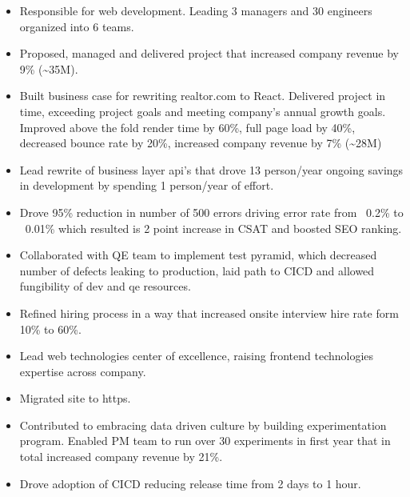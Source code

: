 \documentclass[11pt,a4paper,roman]{moderncv}       %
\begin{document}
\begin{itemize}
    \item Responsible for web development. Leading 3 managers and 30 engineers organized into 6 teams. 
    \item Proposed, managed and delivered project that increased company revenue by 9\% (\textasciitilde35M).
    \item Built business case for rewriting realtor.com to React. Delivered project in time, exceeding project goals and meeting company's annual growth goals. Improved above the fold render time by 60\%, full page load by 40\%, decreased bounce rate by 20\%, increased company revenue by 7\% (\textasciitilde28M)
    \item Lead rewrite of business layer api's that drove 13 person/year ongoing savings in development by spending 1 person/year of effort.
    \item Drove 95\% reduction in number of 500 errors driving error rate from ~0.2\% to ~0.01\% which resulted is 2 point increase in CSAT and boosted SEO ranking.
    \item Collaborated with QE team to implement test pyramid, which decreased number of defects leaking to production, laid path to CICD and allowed fungibility of dev and qe resources.
    \item Refined hiring process in a way that increased onsite interview hire rate form 10\% to 60\%.
    \item Lead web technologies center of excellence, raising frontend technologies expertise across company.
    \item Migrated site to https.
    \item Contributed to embracing data driven culture by building experimentation program. Enabled PM team to run over 30 experiments in first year that in total increased company revenue by 21\%.
    \item Drove adoption of CICD reducing release time from 2 days to 1 hour.
\end{itemize}
\vspace{16pt}


\end{document}
